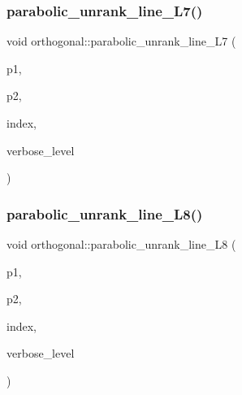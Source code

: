 \subsubsection{\texorpdfstring{parabolic\+\_\+unrank\+\_\+line\+\_\+\+L7()}{parabolic\_unrank\_line\_L7()}}
{\footnotesize\ttfamily void orthogonal\+::parabolic\+\_\+unrank\+\_\+line\+\_\+\+L7 (\begin{DoxyParamCaption}\item[{\mbox{\hyperlink{galois_8h_a09fddde158a3a20bd2dcadb609de11dc}{I\+NT}} \&}]{p1,  }\item[{\mbox{\hyperlink{galois_8h_a09fddde158a3a20bd2dcadb609de11dc}{I\+NT}} \&}]{p2,  }\item[{\mbox{\hyperlink{galois_8h_a09fddde158a3a20bd2dcadb609de11dc}{I\+NT}}}]{index,  }\item[{\mbox{\hyperlink{galois_8h_a09fddde158a3a20bd2dcadb609de11dc}{I\+NT}}}]{verbose\+\_\+level }\end{DoxyParamCaption})}

\mbox{\label{classorthogonal_a97e23bbc8eb995d6ee0dba00f2b0d34f}} 
\subsubsection{\texorpdfstring{parabolic\+\_\+unrank\+\_\+line\+\_\+\+L8()}{parabolic\_unrank\_line\_L8()}}
{\footnotesize\ttfamily void orthogonal\+::parabolic\+\_\+unrank\+\_\+line\+\_\+\+L8 (\begin{DoxyParamCaption}\item[{\mbox{\hyperlink{galois_8h_a09fddde158a3a20bd2dcadb609de11dc}{I\+NT}} \&}]{p1,  }\item[{\mbox{\hyperlink{galois_8h_a09fddde158a3a20bd2dcadb609de11dc}{I\+NT}} \&}]{p2,  }\item[{\mbox{\hyperlink{galois_8h_a09fddde158a3a20bd2dcadb609de11dc}{I\+NT}}}]{index,  }\item[{\mbox{\hyperlink{galois_8h_a09fddde158a3a20bd2dcadb609de11dc}{I\+NT}}}]{verbose\+\_\+level }\end{DoxyParamCaption})}

\mbox{\label{classorthogonal_ae80e0fa8d1e8caddb9afbb466e3d3189}} 

